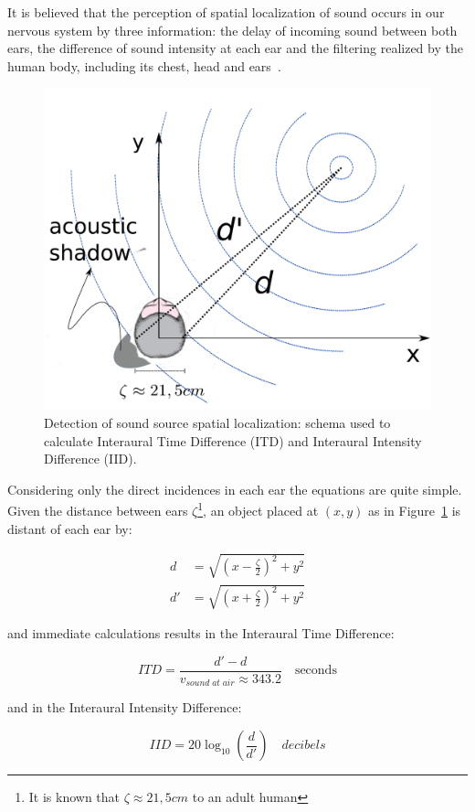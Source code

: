 \documentclass[
 aip,
 jmp,
 amsmath,amssymb,
 reprint,
]{revtex4-1}
\begin{document}
It is believed that the perception of spatial localization of sound occurs in our nervous system by three information: the delay of incoming sound between both ears, the difference of sound intensity at each ear and the filtering realized by the human body, including its chest, head and ears~\cite{Roederer, hrtf, Heeger}. 

\begin{figure}[h!]
    \centering
        \includegraphics[width=.5\textwidth]{figures/espacializacao___}
    \caption{Detection of sound source spatial localization: schema used to calculate Interaural Time Difference (ITD) and Interaural Intensity Difference (IID).}
    \label{fig:spac}
\end{figure}

Considering only the direct incidences in each ear the equations are quite simple. Given the distance between ears $\zeta$\footnote{It is known that $\zeta \approx 21,5cm$ to an adult human}, an object placed at $(x,y)$ as in Figure~\ref{fig:spac} is distant of each ear by:

\begin{equation}\label{eq:distOuvidos}
\begin{split}
d & =\sqrt{\left (x-\frac{\zeta}{2} \right )^2+y^2} \\
d' & =\sqrt{\left (x+\frac{\zeta}{2} \right )^2 + y^2}
\end{split}
\end{equation}

\noindent and immediate calculations results in the Interaural Time Difference:

\begin{equation}\label{eq:dti}
ITD=\frac{d'-d}{v_{sound\;at\;air}\approx 343.2 }\quad \text{seconds}
\end{equation}

\noindent and in the Interaural Intensity Difference:

\begin{equation}\label{eq:dii}
IID=20\log_{10}\left (\frac{d}{d'}\right) \quad decibels
\end{equation}
\end{document}
